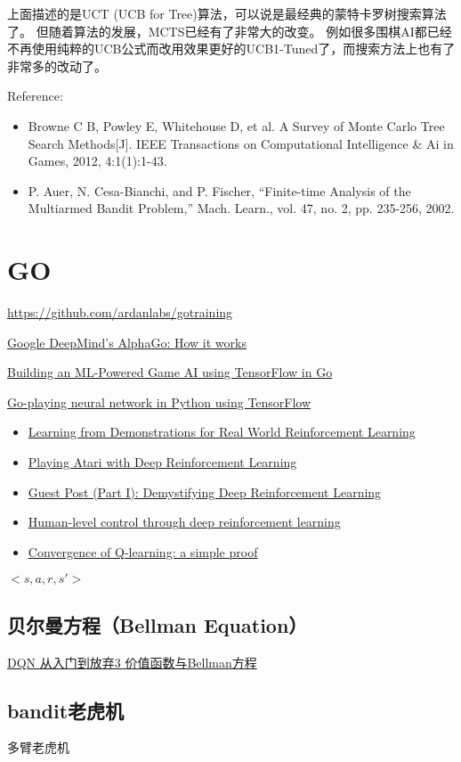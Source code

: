 上面描述的是UCT (UCB for Tree)算法，可以说是最经典的蒙特卡罗树搜索算法了。
但随着算法的发展，MCTS已经有了非常大的改变。
例如很多围棋AI都已经不再使用纯粹的UCB公式而改用效果更好的UCB1-Tuned了，而搜索方法上也有了非常多的改动了。

Reference:
\begin{itemize}
\item Browne C B, Powley E, Whitehouse D, et al. A Survey of Monte Carlo Tree Search Methods[J]. IEEE Transactions on Computational Intelligence \& Ai in Games, 2012, 4:1(1):1-43.
\item P. Auer, N. Cesa-Bianchi, and P. Fischer, “Finite-time Analysis  of the Multiarmed Bandit Problem,” Mach. Learn., vol. 47, no. 2,  pp. 235-256, 2002.
\end{itemize}

\section{GO}

\url{https://github.com/ardanlabs/gotraining}

\href{https://www.tastehit.com/blog/google-deepmind-alphago-how-it-works/}{Google DeepMind's AlphaGo: How it works}

\href{http://gopherdata.io/post/build_ml_powered_game_ai_tensorflow/}{Building an ML-Powered Game AI using TensorFlow in Go}

\href{https://github.com/TheDuck314/go-NN}{Go-playing neural network in Python using TensorFlow}

\begin{itemize}
\item \href{https://arxiv.org/pdf/1704.03732.pdf}{Learning from Demonstrations for Real World Reinforcement Learning}
\item \href{https://arxiv.org/abs/1312.5602}{Playing Atari with Deep Reinforcement Learning}
\item \href{https://www.intelnervana.com/demystifying-deep-reinforcement-learning/}{Guest Post (Part I): Demystifying Deep Reinforcement Learning}
\item \href{https://storage.googleapis.com/deepmind-media/dqn/DQNNaturePaper.pdf}{Human-level control through deep reinforcement learning}
\item \href{http://simplecore-dev.intel.com/nervana/wp-content/uploads/sites/55/2015/12/ProofQlearning.pdf}{Convergence of Q-learning: a simple proof}
\end{itemize}

$<s, a, r, s'>$

\subsection{贝尔曼方程（Bellman Equation）}
\href{https://zhuanlan.zhihu.com/p/21340755?refer=intelligentunit}{DQN 从入门到放弃3 价值函数与Bellman方程}

\subsection{bandit老虎机}
多臂老虎机

\ifx\mlnotes\undefined
    
\fi
